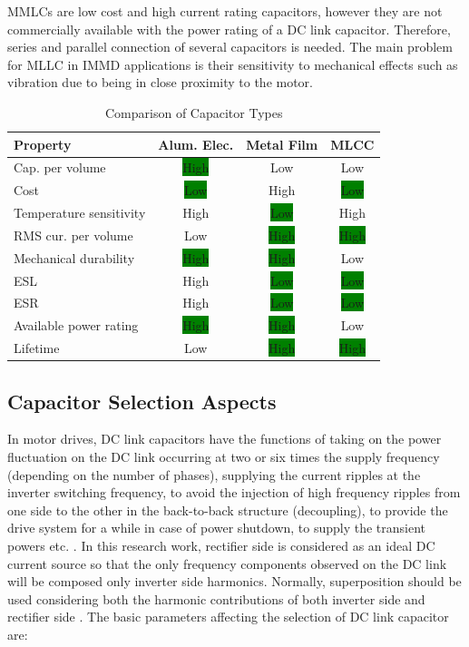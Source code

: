 \documentclass[conference,a4paper,twocolumn]{IEEEtran}
\begin{document}
MMLCs are low cost and high current rating capacitors, however they are not commercially available with the power rating of a DC link capacitor. Therefore, series and parallel connection of several capacitors is needed. The main problem for MLLC in IMMD applications is their sensitivity to mechanical effects such as vibration \cite{Brown2007} due to being in close proximity to the motor.



\begin{table}[h]
\renewcommand{\arraystretch}{1.4}
\caption{Comparison of Capacitor Types}
\label{table1}
\centering
\begin{tabular}{lccc}
\hline
\textbf{Property} & \textbf{Alum. Elec.} & \textbf{Metal Film} & \textbf{MLCC}\\
\hline
Cap. per volume & \colorbox{green}{High} & Low & Low\\
\hline
Cost & \colorbox{green}{Low} & High & \colorbox{green}{Low}\\
\hline
Temperature sensitivity & High & \colorbox{green}{Low} & High\\
\hline
RMS cur. per volume & Low & \colorbox{green}{High} & \colorbox{green}{High}\\
\hline
Mechanical durability & \colorbox{green}{High} & \colorbox{green}{High} & Low\\
\hline
ESL & High & \colorbox{green}{Low} & \colorbox{green}{Low}\\
\hline
ESR & High & \colorbox{green}{Low} & \colorbox{green}{Low}\\
\hline
Available power rating & \colorbox{green}{High} & \colorbox{green}{High} & Low\\
\hline
Lifetime & Low & \colorbox{green}{High} & \colorbox{green}{High}\\
\hline
\end{tabular}
\end{table}


\subsection{Capacitor Selection Aspects}

In motor drives, DC link capacitors have the functions of taking on the power fluctuation on the DC link occurring at two or six times the supply frequency (depending on the number of phases), supplying the current ripples at the inverter switching frequency, to avoid the injection of high frequency ripples from one side to the other in the back-to-back structure (decoupling), to provide the drive system for a while in case of power shutdown, to supply the transient powers etc. \cite{Bianchi2003}. In this research work, rectifier side is considered as an ideal DC current source so that the only frequency components observed on the DC link will be composed only inverter side harmonics. Normally, superposition should be used considering both the harmonic contributions of both inverter side and rectifier side \cite{Bianchi2003}.
The basic parameters affecting the selection of DC link capacitor are:
\end{document}
